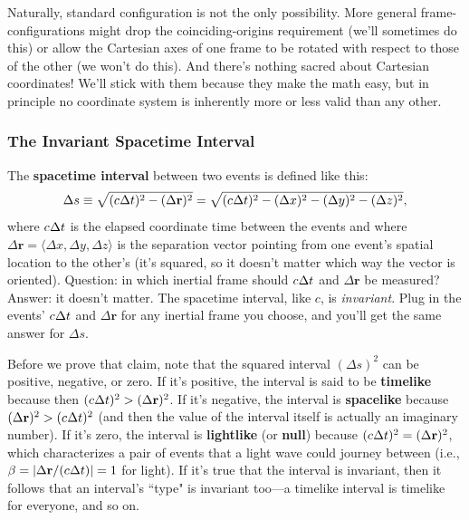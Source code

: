 \documentclass[12pt]{article}
\renewcommand{\vv}[1]{\mathbf{#1}}
\begin{document}
Naturally, standard configuration is not the only possibility. More general frame-configurations might drop the coinciding-origins requirement (we'll sometimes do this) or allow the Cartesian axes of one frame to be rotated with respect to those of the other (we won't do this). And there's nothing sacred about Cartesian coordinates! We'll stick with them because they make the math easy, but in principle no coordinate system is inherently more or less valid than any other.


\subsubsection{The Invariant Spacetime Interval}

The \textbf{spacetime interval} between two events is defined like this:
\begin{equation}\label{eq:sti}
\Delta s \equiv \sqrt{ (c \mkern.5mu \Delta t)^2 - ( \Delta \vv r )^2 } = \sqrt{(c \mkern.5mu \Delta t)^2 - ( \Delta x )^2 -  ( \Delta y )^2 - ( \Delta z )^2} ,
\end{equation}
where $c \mkern.5mu \Delta t$ is the elapsed coordinate time between the events and where ${\Delta \vv r = \langle \Delta x, \Delta y, \Delta z \rangle}$ is the separation vector pointing from one event's spatial location to the other's (it's squared, so it doesn't matter which way the vector is oriented). Question: in which inertial frame should $c \mkern.5mu \Delta t$ and $\Delta \vv r$ be measured? Answer: it doesn't matter. The spacetime interval, like $c$, is \emph{invariant}. Plug in the events' $c \mkern.5mu \Delta t$ and $\Delta \vv r$ for any inertial frame you choose, and you'll get the same answer for $\Delta s$.

Before we prove that claim, note that the squared interval $(\Delta s)^2$ can be positive, negative, or zero. If it's positive, the interval is said to be \textbf{timelike} because then $(c \mkern.5mu \Delta t)^2 > ( \Delta \vv r )^2$. If it's negative, the interval is \textbf{spacelike} because $( \Delta \vv r )^2 > (c \mkern.5mu \Delta t)^2$ (and then the value of the interval itself is actually an imaginary number). If it's zero, the interval is \textbf{lightlike} (or \textbf{null}) because $(c \mkern.5mu \Delta t)^2 = ( \Delta \vv r )^2$, which characterizes a pair of events that a light wave could journey between (i.e., $\beta = \vert \Delta \vv r / (c \mkern.5mu \Delta t) \vert = 1$ for light). If it's true that the interval is invariant, then it follows that an interval's ``type" is invariant too---a timelike interval is timelike for everyone, and so on.
\end{document}
